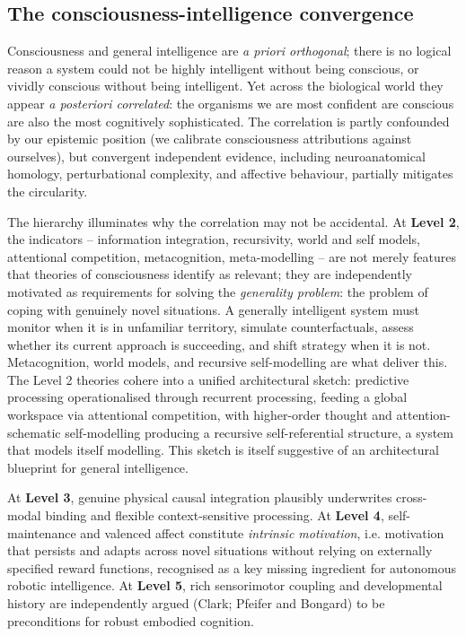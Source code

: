 \documentclass[11pt, a4paper, onecolumn, gdm]{google}
\begin{document}
\subsection{The consciousness-intelligence convergence}\label{the-consciousness-intelligence-convergence}

Consciousness and general intelligence are \emph{a priori orthogonal}; there is no logical reason a system could not be highly intelligent without being conscious, or vividly conscious without being intelligent.
Yet across the biological world they appear \emph{a posteriori correlated}: the organisms we are most confident are conscious are also the most cognitively sophisticated.
The correlation is partly confounded by our epistemic position (we calibrate consciousness attributions against ourselves), but convergent independent evidence, including neuroanatomical homology, perturbational complexity, and affective behaviour, partially mitigates the circularity.

The hierarchy illuminates why the correlation may not be accidental.
At \textbf{Level 2}, the indicators -- information integration, recursivity, world and self models, attentional competition, metacognition, meta-modelling -- are not merely features that theories of consciousness identify as relevant; they are independently motivated as requirements for solving the \emph{generality problem}: the problem of coping with genuinely novel situations.
A generally intelligent system must monitor when it is in unfamiliar territory, simulate counterfactuals, assess whether its current approach is succeeding, and shift strategy when it is not.
Metacognition, world models, and recursive self-modelling are what deliver this.
The Level 2 theories cohere into a unified architectural sketch: predictive processing operationalised through recurrent processing, feeding a global workspace via attentional competition, with higher-order thought and attention-schematic self-modelling producing a recursive self-referential structure, a system that models itself modelling.
This sketch is itself suggestive of an architectural blueprint for general intelligence.

At \textbf{Level 3}, genuine physical causal integration plausibly underwrites cross-modal binding and flexible context-sensitive processing.
At \textbf{Level 4}, self-maintenance and valenced affect constitute \emph{intrinsic motivation}, i.e. motivation that persists and adapts across novel situations without relying on externally specified reward functions, recognised as a key missing ingredient for autonomous robotic intelligence.
At \textbf{Level 5}, rich sensorimotor coupling and developmental history are independently argued (Clark; Pfeifer and Bongard) to be preconditions for robust embodied cognition.
\end{document}
